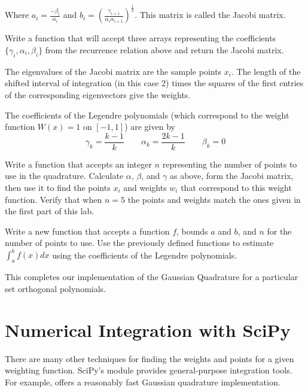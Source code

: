 Where $a_i = \frac{-\beta_i}{\alpha_i}$ and $b_i = (\frac{\gamma_{i+1}}{\alpha_i \alpha_{i+1}})^{\frac{1}{2}}$.
This matrix is called the Jacobi matrix.

\begin{problem} %
Write a function that will accept three arrays representing the coefficients $\{\gamma_i, \alpha_i, \beta_i\}$ from the recurrence relation above and return the Jacobi matrix.
\end{problem}

The eigenvalues of the Jacobi matrix are the sample points $x_i$.
The length of the shifted interval of integration (in this case 2) times the squares of the first entries of the corresponding eigenvectors give the weights.

\begin{problem} %
The coefficients of the Legendre polynomials (which correspond to the weight function $W(x) = 1$ on $[-1,1]$) are given by
\[\gamma_k = \frac{k-1}{k} \qquad \alpha_k = \frac{2k - 1}{k} \qquad \beta_k = 0\]

Write a function that accepts an integer $n$ representing the number of points to use in the quadrature. Calculate $\alpha$, $\beta$, and $\gamma$ as above, form the Jacobi matrix, then use it to find the points $x_i$ and weights $w_i$ that correspond to this weight function.
Verify that when $n=5$ the points and weights match the ones given in the first part of this lab.
\end{problem}

\begin{problem} %
Write a new function that accepts a function $f$, bounds $a$ and $b$, and $n$ for the number of points to use.
Use the previously defined functions to estimate $\int_a^b f(x)dx$ using the coefficients of the Legendre polynomials.

This completes our implementation of the Gaussian Quadrature for a particular set orthogonal polynomials.
\end{problem}

\newpage

\section*{Numerical Integration with SciPy} %

There are many other techniques for finding the weights and points for a given weighting function.
SciPy's  module provides general-purpose integration tools.
For example,  offers a reasonably fast Gaussian quadrature implementation.

